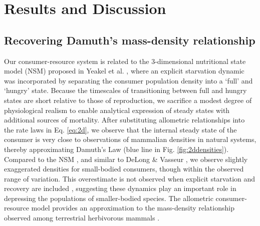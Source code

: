 \documentclass[]{rsos}%
\begin{document}


\section{Results and Discussion}
\subsection{Recovering Damuth's mass-density relationship}
Our consumer-resource system is related to the 3-dimensional nutritional state model (NSM) proposed in Yeakel et al. \cite{yeakel2018dynamics}, where an explicit starvation dynamic was incorporated by separating the consumer population density into a `full' and `hungry' state.
Because the timescales of transitioning between full and hungry states are short relative to those of reproduction, we sacrifice a modest degree of physiological realism to enable analytical expression of steady states with additional sources of mortality.
After substituting allometric relationships into the rate laws in Eq. \ref{eq:2d}, we observe that the internal steady state of the consumer is very close to observations of mammalian densities in natural systems, thereby approximating Damuth's Law (blue line in Fig. \ref{fig:2ddensities}).
Compared to the NSM \cite{yeakel2018dynamics}, and similar to DeLong \& Vasseur \cite{DeLong:2010dy}, we observe slightly exaggerated densities for small-bodied consumers, though within the observed range of variation.
This overestimate is not observed when explicit starvation and recovery are included \cite{yeakel2018dynamics}, suggesting these dynamics play an important role in depressing the populations of smaller-bodied species.
The allometric consumer-resource model provides an approximation to the mass-density relationship observed among terrestrial herbivorous mammals \cite{Damuth1987}.
\end{document}

